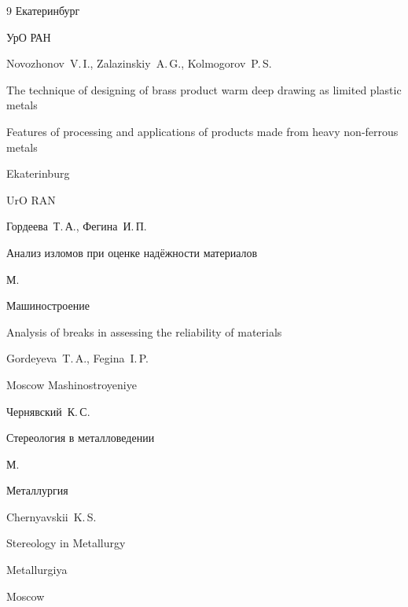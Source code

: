\begin{thebibliography}{9}
\publaddr Екатеринбург

\publ УрО РАН


\misctransl 

\by Novozhonov~V.\,I., Zalazinskiy~A.\,G., Kolmogorov~P.\,S.

\paper The technique of designing of brass product warm deep drawing  as limited plastic metals

\inbook Features of processing and applications of products made from heavy non-ferrous metals

\publaddr Ekaterinburg

\publ UrO RAN









\by Гордеева~Т.\,А., Фегина~И.\,П.

\book Анализ изломов при оценке надёжности материалов

\publaddr М.

\publ Машиностроение



\misctransl

\book Analysis of breaks in assessing the reliability of materials

\by Gordeyeva~T.\,A., Fegina~I.\,P.

\publaddr Moscow \publ Mashinostroyeniye  






\by Чернявский~К.\,С.

\book Стереология в металловедении

\publaddr М.

\publ Металлургия



\misctransl

\by Chernyavskii~K.\,S.

\book Stereology in Metallurgy 

\publ Metallurgiya

\publaddr Moscow 









\end{thebibliography}





